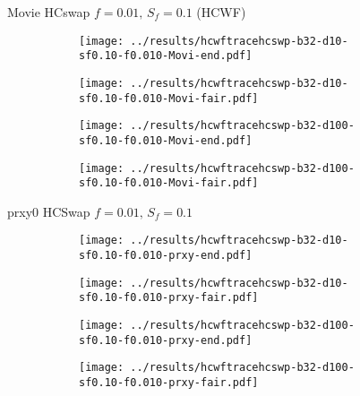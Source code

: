 \documentclass[8pt,a4paper]{beamer}
\begin{document}
\begin{frame}{Movie HCswap $f=0.01,\, S_f=0.1$ (HCWF)}
	\begin{figure}
		\begin{subfigure}{.48\textwidth}
			\centering
			\texttt{[image: ../results/hcwftracehcswp-b32-d10-sf0.10-f0.010-Movi-end.pdf]}
		\end{subfigure}
		\begin{subfigure}{.48\textwidth}
			\centering
			\texttt{[image: ../results/hcwftracehcswp-b32-d10-sf0.10-f0.010-Movi-fair.pdf]}
		\end{subfigure}
	\end{figure}
	
	\begin{figure}
		\begin{subfigure}{.48\textwidth}
			\centering
			\texttt{[image: ../results/hcwftracehcswp-b32-d100-sf0.10-f0.010-Movi-end.pdf]}
		\end{subfigure}
		\begin{subfigure}{.48\textwidth}
			\centering
			\texttt{[image: ../results/hcwftracehcswp-b32-d100-sf0.10-f0.010-Movi-fair.pdf]}
		\end{subfigure}
	\end{figure}
\end{frame}


\begin{frame}{prxy0 HCSwap $f=0.01,\, S_f=0.1$}
	\begin{figure}
		\begin{subfigure}{.48\textwidth}
			\centering
			\texttt{[image: ../results/hcwftracehcswp-b32-d10-sf0.10-f0.010-prxy-end.pdf]}
		\end{subfigure}
		\begin{subfigure}{.48\textwidth}
			\centering
			\texttt{[image: ../results/hcwftracehcswp-b32-d10-sf0.10-f0.010-prxy-fair.pdf]}
		\end{subfigure}
	\end{figure}
	
	\begin{figure}
		\begin{subfigure}{.48\textwidth}
			\centering
			\texttt{[image: ../results/hcwftracehcswp-b32-d100-sf0.10-f0.010-prxy-end.pdf]}
		\end{subfigure}
		\begin{subfigure}{.48\textwidth}
			\centering
			\texttt{[image: ../results/hcwftracehcswp-b32-d100-sf0.10-f0.010-prxy-fair.pdf]}
		\end{subfigure}
	\end{figure}
\end{frame}
\end{document}
